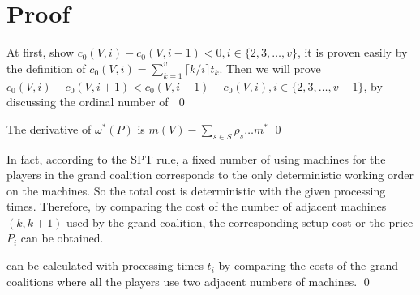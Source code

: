 \clearpage
\section*{Proof}

\begin{pf}[Theorem 1]
At first, show $c_0(V,i)- c_0(V,i-1) < 0, i \in \{2,3,\ldots,v\}$, it is proven easily by the definition of $c_0(V,i) = \sum_{k=1}^{v} {\lceil k/i \rceil} t_{k}$.
Then we will prove $c_0 (V,i) - c_0 (V,i+1) < c_0 (V,i-1) - c_0 (V,i), i \in \{2,3,\ldots,v-1\}$, by discussing the ordinal number of $ $
  \qed
\end{pf}

\begin{pf}[Lemma 1]
The derivative of $\omega^*(P)$ is $m(V) - \sum_{s \in S} \rho_s \dots m^* $
  \qed
\end{pf}

\begin{pf}[Lemma 2]
  In fact, according to the SPT rule, a fixed number of using machines for the players in the grand coalition corresponds to the only deterministic working order on the machines. So the total cost is
  deterministic with the given processing times.
  Therefore, by comparing the cost of the number of adjacent machines $(k, k + 1)$ used by the grand coalition, the corresponding setup cost or the price $P_i$ can be obtained.

can be calculated with processing times $t_i$ by comparing the costs of the grand coalitions where all the players use two adjacent numbers of machines.
  \qed
\end{pf}


